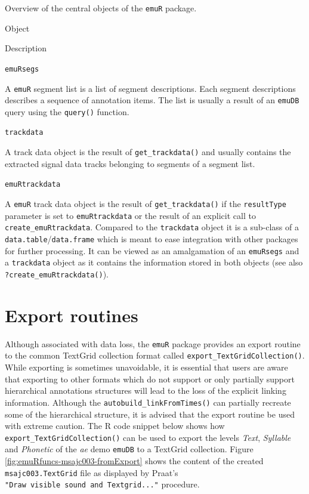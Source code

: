 \documentclass[]{book}
\begin{document}
\label{tab:emuRpackageDetails-centralObjects}Overview of the central objects of the \texttt{emuR} package.

Object

Description

\texttt{emuRsegs}

A \texttt{emuR} segment list is a list of segment descriptions. Each segment descriptions describes a sequence of annotation items. The list is usually a result of an \texttt{emuDB} query using the \texttt{query()} function.

\texttt{trackdata}

A track data object is the result of \texttt{get\_trackdata()} and usually contains the extracted signal data tracks belonging to segments of a segment list.

\texttt{emuRtrackdata}

A \texttt{emuR} track data object is the result of \texttt{get\_trackdata()} if the \texttt{resultType} parameter is set to \texttt{emuRtrackdata} or the result of an explicit call to \texttt{create\_emuRtrackdata}. Compared to the \texttt{trackdata} object it is a sub-class of a \texttt{data.table}/\texttt{data.frame} which is meant to ease integration with other packages for further processing. It can be viewed as an amalgamation of an \texttt{emuRsegs} and a \texttt{trackdata} object as it contains the information stored in both objects (see also \texttt{?create\_emuRtrackdata()}).

\hypertarget{sec:emuRpackageDetails-exportRoutines}{%
\section{Export routines}\label{sec:emuRpackageDetails-exportRoutines}}

Although associated with data loss, the \texttt{emuR} package provides an export routine to the common TextGrid collection format called \texttt{export\_TextGridCollection()}. While exporting is sometimes unavoidable, it is essential that users are aware that exporting to other formats which do not support or only partially support hierarchical annotations structures will lead to the loss of the explicit linking information. Although the \texttt{autobuild\_linkFromTimes()} can partially recreate some of the hierarchical structure, it is advised that the export routine be used with extreme caution. The R code snippet below shows how \texttt{export\_TextGridCollection()} can be used to export the levels \emph{Text}, \emph{Syllable} and \emph{Phonetic} of the \emph{ae} demo \texttt{emuDB} to a TextGrid collection. Figure \ref{fig:emuRfuncs-msajc003-fromExport} shows the content of the created \texttt{msajc003.TextGrid} file as displayed by Praat's \texttt{"Draw\ visible\ sound\ and\ Textgrid..."} procedure.
\end{document}
